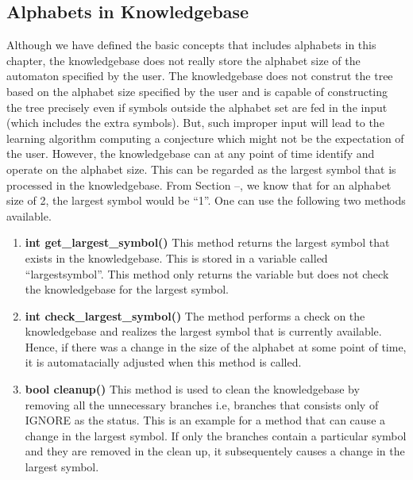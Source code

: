 \subsection{Alphabets in Knowledgebase}
	Although we have defined the basic concepts that includes alphabets in this chapter, the knowledgebase does not really store the alphabet size of the automaton specified by the user. The knowledgebase does not construt the tree based on the alphabet size specified by the user and is capable of constructing the tree precisely even if symbols outside the alphabet set are fed in the input (which includes the extra symbols). But, such improper input will lead to the learning algorithm computing a conjecture which might not be the expectation of the user.
	However, the knowledgebase can at any point of time identify and operate on the alphabet size. This can be regarded as the largest symbol that is processed in the knowledgebase. From Section --, we know that for an alphabet size of 2, the largest symbol would be ``1''.
One can use the following two methods available.
\begin{enumerate}
\item \textbf{int get\_largest\_symbol()} \hfill \vskip 1pt
	This method returns the largest symbol that exists in the knowledgebase. This is stored in a variable called ``largestsymbol''. This method only returns the variable but does not check the knowledgebase for the largest symbol.
\item \textbf{int check\_largest\_symbol()} \hfill \vskip 1pt
	The method performs a check on the knowledgebase and realizes the largest symbol that is currently available. Hence, if there was a change in the size of the alphabet at some point of time, it is automatacially adjusted when this method is called.
\item \textbf{bool cleanup()} \hfill \vskip 1pt
	This method is used to clean the knowledgebase by removing all the unnecessary branches i.e, branches that consists only of IGNORE as the status. This is an example for a method that can cause a change in the largest symbol. If only the branches contain a particular symbol and they are removed in the clean up, it subsequentely causes a change in the largest symbol. 
\end{enumerate}

